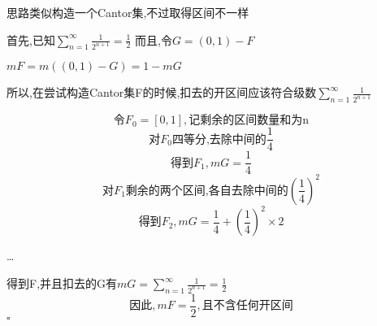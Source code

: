 \documentclass[a4paper]{article}
\begin{document}
        思路类似构造一个Cantor集,不过取得区间不一样

        首先,已知$\sum_{n=1}^{\infty} \frac{1}{2^{n+1}} = \frac{1}{2}$
        而且,令$G=(0,1)-F$

        $mF=m((0,1)-G)=1-mG$
        
        所以,在尝试构造Cantor集F的时候,扣去的开区间应该符合级数$\sum_{n=1}^{\infty} \frac{1}{2^{n+1}}$

        \[\text{令}F_0=[0,1],\text{记剩余的区间数量和为n}\]
        \[\text{对}F_0\text{四等分,去除中间的}\frac{1}{4}\]
        \[\text{得到}F_1,mG=\frac{1}{4}\]
        \[\text{对}F_1\text{剩余的两个区间,各自去除中间的}(\frac{1}{4})^2\]
        \[\text{得到}F_2,mG=\frac{1}{4} + (\frac{1}{4})^2\times2\]

        \ldots

        得到F,并且扣去的G有$mG=\sum_{n=1}^{\infty} \frac{1}{2^{n+1}} = \frac{1}{2}$
        \[\text{因此},mF=\frac{1}{2},\text{且不含任何开区间}\]
    \hfill $\square$
\end{document}
